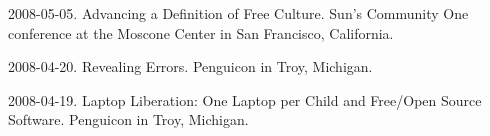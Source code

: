 \documentclass[10pt]{article}
\newenvironment{cvlist}{
\begin{list}{}{\leftmargin=3.0em \itemindent=-3.0em}
  \setlength{\itemsep}{0pt}
  \setlength{\parskip}{0em}
  \setlength{\parsep}{1em}
  \setlength{\parindent}{0em}}
{\vspace{1em}
\end{list}}
\begin{document}
\begin{cvlist}
\item 2008-05-05. Advancing a Definition of Free Culture. Sun's Community One conference at the Moscone Center in San Francisco, California.
\item 2008-04-20. Revealing Errors. Penguicon in Troy, Michigan. %
\item 2008-04-19. Laptop Liberation: One Laptop per Child and Free/Open Source Software. Penguicon in Troy, Michigan. %

\end{cvlist}
\end{document}
